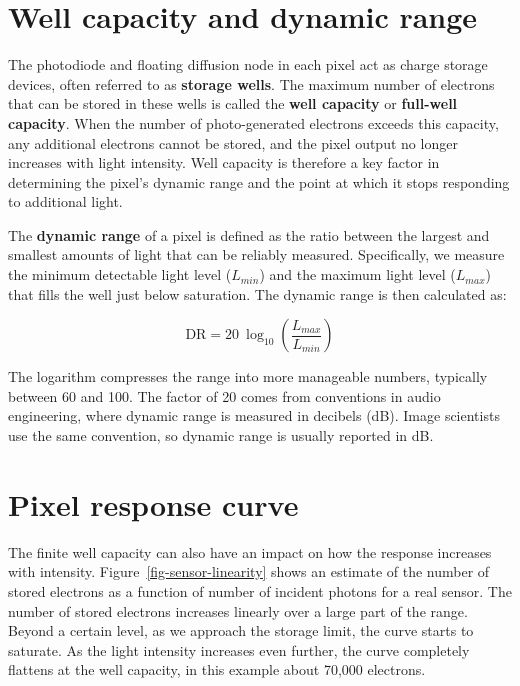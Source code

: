 \documentclass[
  letterpaper,
]{book}
\begin{document}
\section{Well capacity and dynamic
range}\label{sec-wellcapacity-dynamicrange}

The photodiode and floating diffusion node in each pixel act as charge
storage devices, often referred to as \textbf{storage wells}. The
maximum number of electrons that can be stored in these wells is called
the \textbf{well capacity} or \textbf{full-well capacity}. When the
number of photo-generated electrons exceeds this capacity, any
additional electrons cannot be stored, and the pixel output no longer
increases with light intensity. Well capacity is therefore a key factor
in determining the pixel's dynamic range and the point at which it stops
responding to additional light.

The \textbf{dynamic range} of a pixel is defined as the ratio between
the largest and smallest amounts of light that can be reliably measured.
Specifically, we measure the minimum detectable light level
(\(L_{min}\)) and the maximum light level (\(L_{max}\)) that fills the
well just below saturation. The dynamic range is then calculated as:

\[
\text{DR} = 20~\log_{10}\left(\frac{L_{max}}{L_{min}}\right)
\]

The logarithm compresses the range into more manageable numbers,
typically between 60 and 100. The factor of 20 comes from conventions in
audio engineering, where dynamic range is measured in decibels (dB).
Image scientists use the same convention, so dynamic range is usually
reported in dB.

\section{Pixel response curve}\label{sec-pixel-responsecurve}

The finite well capacity can also have an impact on how the response
increases with intensity. Figure~\ref{fig-sensor-linearity} shows an
estimate of the number of stored electrons as a function of number of
incident photons for a real sensor. The number of stored electrons
increases linearly over a large part of the range. Beyond a certain
level, as we approach the storage limit, the curve starts to saturate.
As the light intensity increases even further, the curve completely
flattens at the well capacity, in this example about 70,000 electrons.
\end{document}

